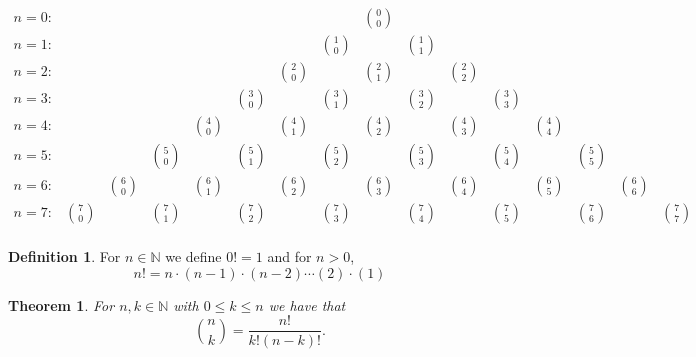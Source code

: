 \documentclass[
]{book}
\newtheorem{theorem}{Theorem}[chapter]
\theoremstyle{definition}
\newtheorem{definition}{Definition}[chapter]
\theoremstyle{definition}
\theoremstyle{definition}
\theoremstyle{definition}
\theoremstyle{remark}
\begin{document}
\[\begin{array}{lccccccccccccccc}
n=0: & & & & & & & & \binom{0}{0} & & & & & & & \\
n=1: & & & & & & & \binom{1}{0} &  & \binom{1}{1} & & & & & & \\
n=2: & & & & & & \binom{2}{0} &  & \binom{2}{1} &  & \binom{2}{2} & & & & & \\
n=3: & & & & & \binom{3}{0} &  & \binom{3}{1} &  & \binom{3}{2}  &  & \binom{3}{3} & & & & \\
n=4: & & & & \binom{4}{0} &  & \binom{4}{1} &  & \binom{4}{2}  & & \binom{4}{3} &  & \binom{4}{4} & & & \\
n=5: & & & \binom{5}{0} &  & \binom{5}{1} &  & \binom{5}{2}  &   & \binom{5}{3} &  & \binom{5}{4}  &  & \binom{5}{5} & & \\
n=6: & & \binom{6}{0} &  & \binom{6}{1} &  & \binom{6}{2}  &  & \binom{6}{3}  &  & \binom{6}{4}  & & \binom{6}{5} &  & \binom{6}{6} & \\
n=7: & \binom{7}{0} &  & \binom{7}{1} &  & \binom{7}{2}  & & \binom{7}{3} &  & \binom{7}{4} &  & \binom{7}{5} &  & \binom{7}{6} &  & \binom{7}{7} \\
\end{array}\]

\begin{definition}
For \(n\in \mathbb{N}\) we define \(0!=1\) and for \(n>0\), \[n!=n\cdot (n-1) \cdot (n-2) \cdots (2)\cdot (1)\]
\end{definition}

\begin{theorem}
For \(n,k\in \mathbb{N}\) with \(0\leq k \leq n\) we have that
\[\binom{n}{k} = \frac{n!}{k!(n-k)!}.\]
\end{theorem}
\end{document}
